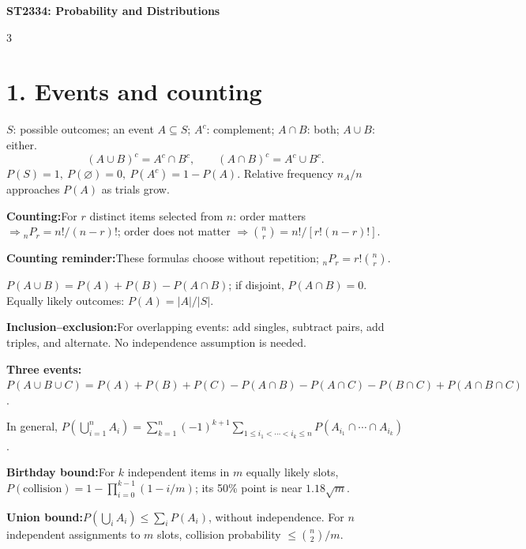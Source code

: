 \documentclass[10pt,a4paper,landscape]{article}
\newcommand{\CheatNote}[2]{\par\noindent\textcolor{cueorange}{\textbf{#1:}}\;#2\par}
\begin{document}
\fontsize{8}{8.9}\selectfont
\setlength{\abovedisplayskip}{2pt}
\setlength{\belowdisplayskip}{2pt}
\setlength{\abovedisplayshortskip}{2pt}
\setlength{\belowdisplayshortskip}{2pt}
\begin{center}{\large\color{sectionblue}\bfseries ST2334: Probability and Distributions}\end{center}
\vspace{-3.5mm}
\begin{multicols}{3}

\section*{1. Events and counting}
\(S\): possible outcomes; an event \(A\subseteq S\); \(A^c\): complement; \(A\cap B\): both; \(A\cup B\): either.
\[ (A\cup B)^c=A^c\cap B^c,\qquad (A\cap B)^c=A^c\cup B^c. \]
\(P(S)=1,\ P(\varnothing)=0,\ P(A^c)=1-P(A)\). Relative frequency \(n_A/n\) approaches \(P(A)\) as trials grow.
\CheatNote{Counting}{For \(r\) distinct items selected from \(n\): order matters \(\Rightarrow {}_nP_r=n!/(n-r)!\); order does not matter \(\Rightarrow {n\choose r}=n!/[r!(n-r)!]\).}
\CheatNote{Counting reminder}{These formulas choose without repetition; \({}_nP_r=r!{n\choose r}\).}
\(P(A\cup B)=P(A)+P(B)-P(A\cap B)\); if disjoint, \(P(A\cap B)=0\). Equally likely outcomes: \(P(A)=|A|/|S|\).
\CheatNote{Inclusion--exclusion}{For overlapping events: add singles, subtract pairs, add triples, and alternate. No independence assumption is needed.}
\CheatNote{Three events}{\(P(A\cup B\cup C)=P(A)+P(B)+P(C)-P(A\cap B)-P(A\cap C)-P(B\cap C)+P(A\cap B\cap C)\).}
In general, \(P(\bigcup_{i=1}^n A_i)=\sum_{k=1}^n(-1)^{k+1}\sum_{1\le i_1<\cdots<i_k\le n}P(A_{i_1}\cap\cdots\cap A_{i_k})\).

\CheatNote{Birthday bound}{For \(k\) independent items in \(m\) equally likely slots, \(P(\mathrm{collision})=1-\prod_{i=0}^{k-1}(1-i/m)\); its 50\% point is near \(1.18\sqrt m\).}
\CheatNote{Union bound}{\(P(\bigcup_i A_i)\le\sum_iP(A_i)\), without independence. For \(n\) independent assignments to \(m\) slots, collision probability \(\le {n\choose2}/m\).}


\end{multicols}
\end{document}
